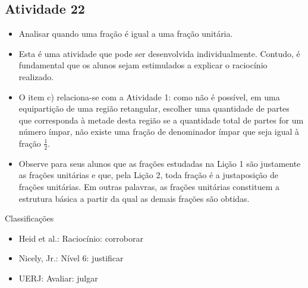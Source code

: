\documentclass[oneside]{book}
\begin{document}
\begin{multicols}{2}
\subsection{Atividade 22}

\begin{itemize} %
    \item       Analisar quando uma fração é igual a uma fração unitária.
\end{itemize} %
  
  
 
\begin{itemize} %
    \item       Esta é uma atividade que pode ser desenvolvida individualmente. 
Contudo, é fundamental que os alunos sejam estimulados a explicar o raciocínio 
realizado.
    \item       O item c) relaciona-se com a Atividade 1: como não é possível, 
em uma equipartição de uma região retangular, escolher uma quantidade de partes 
que corresponda à metade desta região se a quantidade total de partes for um 
número ímpar, não existe uma fração de denominador ímpar que seja igual à fração 
      $\frac{1}{2}$.
    \item       Observe para seus alunos que as frações estudadas na Lição 1 são 
justamente as frações unitárias e que, pela Lição 2, toda fração é a 
justaposição de frações unitárias. Em outras palavras, as frações unitárias 
constituem a estrutura básica a partir da qual as demais frações são obtidas.
\end{itemize} %
  
  
  Classificações  
\begin{itemize} %
    \item       Heid et al.: Raciocínio: corroborar
    \item       Nicely, Jr.: Nível 6: justificar
    \item       UERJ: Avaliar: julgar
\end{itemize} %
  

\end{multicols}
\end{document}
